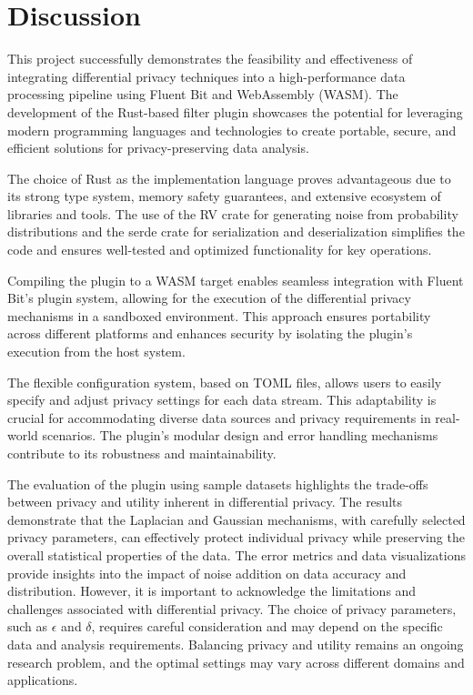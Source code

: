 \chapter{Discussion\label{chap:discussion}}
This project successfully demonstrates the feasibility and effectiveness of integrating differential privacy techniques into a high-performance data processing pipeline using Fluent Bit and WebAssembly (WASM). The development of the Rust-based filter plugin showcases the potential for leveraging modern programming languages and technologies to create portable, secure, and efficient solutions for privacy-preserving data analysis.

The choice of Rust as the implementation language proves advantageous due to its strong type system, memory safety guarantees, and extensive ecosystem of libraries and tools. The use of the RV crate for generating noise from probability distributions and the serde crate for serialization and deserialization simplifies the code and ensures well-tested and optimized functionality for key operations.

Compiling the plugin to a WASM target enables seamless integration with Fluent Bit's plugin system, allowing for the execution of the differential privacy mechanisms in a sandboxed environment. This approach ensures portability across different platforms and enhances security by isolating the plugin's execution from the host system.

The flexible configuration system, based on TOML files, allows users to easily specify and adjust privacy settings for each data stream. This adaptability is crucial for accommodating diverse data sources and privacy requirements in real-world scenarios. The plugin's modular design and error handling mechanisms contribute to its robustness and maintainability.

The evaluation of the plugin using sample datasets highlights the trade-offs between privacy and utility inherent in differential privacy. The results demonstrate that the Laplacian and Gaussian mechanisms, with carefully selected privacy parameters, can effectively protect individual privacy while preserving the overall statistical properties of the data. The error metrics and data visualizations provide insights into the impact of noise addition on data accuracy and distribution.
However, it is important to acknowledge the limitations and challenges associated with differential privacy. The choice of privacy parameters, such as $\epsilon$ and $\delta$, requires careful consideration and may depend on the specific data and analysis requirements. Balancing privacy and utility remains an ongoing research problem, and the optimal settings may vary across different domains and applications.

